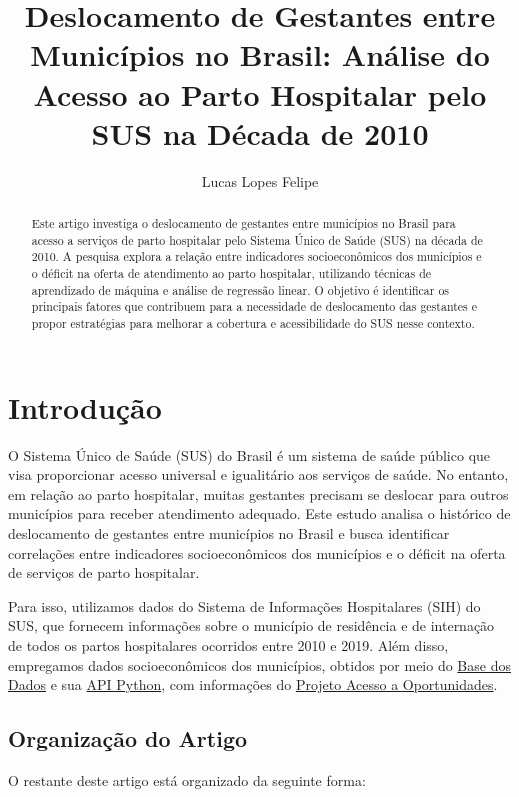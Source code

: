 \documentclass{article}
\title{Deslocamento de Gestantes entre Municípios no Brasil: Análise do Acesso ao Parto Hospitalar pelo SUS na Década de 2010}
\author{Lucas Lopes Felipe}
\date{}
\begin{document}
\maketitle

\begin{abstract}
Este artigo investiga o deslocamento de gestantes entre municípios no Brasil para acesso a serviços de parto hospitalar pelo Sistema Único de Saúde (SUS) na década de 2010. A pesquisa explora a relação entre indicadores socioeconômicos dos municípios e o déficit na oferta de atendimento ao parto hospitalar, utilizando técnicas de aprendizado de máquina e análise de regressão linear. O objetivo é identificar os principais fatores que contribuem para a necessidade de deslocamento das gestantes e propor estratégias para melhorar a cobertura e acessibilidade do SUS nesse contexto.
\end{abstract}

\section{Introdução}

O Sistema Único de Saúde (SUS) do Brasil é um sistema de saúde público que visa proporcionar acesso universal e igualitário aos serviços de saúde. No entanto, em relação ao parto hospitalar, muitas gestantes precisam se deslocar para outros municípios para receber atendimento adequado. Este estudo analisa o histórico de deslocamento de gestantes entre municípios no Brasil e busca identificar correlações entre indicadores socioeconômicos dos municípios e o déficit na oferta de serviços de parto hospitalar.

Para isso, utilizamos dados do Sistema de Informações Hospitalares (SIH) do SUS, que fornecem informações sobre o município de residência e de internação de todos os partos hospitalares ocorridos entre 2010 e 2019. Além disso, empregamos dados socioeconômicos dos municípios, obtidos por meio do \href{https://basedosdados.org/}{Base dos Dados} e sua \href{https://basedosdados.github.io/mais/api_reference_python/}{API Python}, com informações do \href{https://basedosdados.org/dataset/br-ipea-acesso-oportunidades?bdm_table=estatisticas_2019}{Projeto Acesso a Oportunidades}.

\subsection{Organização do Artigo}

O restante deste artigo está organizado da seguinte forma:
\end{document}
